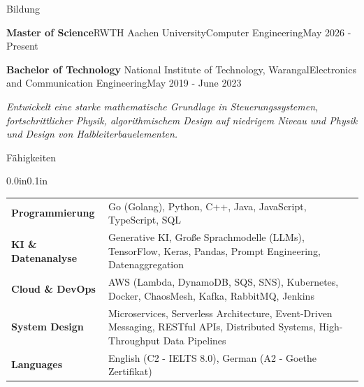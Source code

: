 \documentclass{resume} %
\makeatletter
\newcommand{\italicitem}[1]{\item{\textit{#1}}}
\newcommand{\entry}[2]{#1 & #2 \tabularnewline} %
\newcommand{\tableEnv}[2]{%
  \begin{rSection}{#1} 
    \begin{adjustwidth}{0.0in}{0.1in} 
      \begin{tabularx}{\linewidth}{@{} >{\bfseries}l @{\hspace{6ex}} X @{}}
        #2 
      \end{tabularx}
    \end{adjustwidth}
  \end{rSection}
}
\makeatother
\begin{document}
\begin{rSection}{Bildung}

    \begin{rSubsectionNoBullet}{\bf Master of Science}{RWTH Aachen University}{Computer Engineering}{May 2026 - Present}
        \italicitem{}
    \end{rSubsectionNoBullet}
    
    \begin{rSubsectionNoBullet}{\bf Bachelor of Technology }{National Institute of Technology, Warangal}{Electronics and Communication Engineering}{May 2019 - June 2023}
        \italicitem{Entwickelt eine starke mathematische Grundlage in Steuerungssystemen, fortschrittlicher Physik, algorithmischem Design auf niedrigem Niveau und Physik und Design von Halbleiterbauelementen.}
    \end{rSubsectionNoBullet}

\end{rSection}


\tableEnv{Fähigkeiten}{
    \entry{Programmierung}{Go (Golang), Python, C++, Java, JavaScript, TypeScript, SQL}
    
    \entry{KI \& Datenanalyse}{Generative KI, Große Sprachmodelle (LLMs), TensorFlow, Keras, Pandas, Prompt Engineering, Datenaggregation}
    
    \entry{Cloud \& DevOps}{AWS (Lambda, DynamoDB, SQS, SNS), Kubernetes, Docker, ChaosMesh, Kafka, RabbitMQ, Jenkins}
    
    \entry{System Design}{Microservices, Serverless Architecture, Event-Driven Messaging, RESTful APIs, Distributed Systems, High-Throughput Data Pipelines}

    \entry{Languages}{English (C2 - IELTS 8.0), German (A2 - Goethe Zertifikat)}
}

\end{document}
